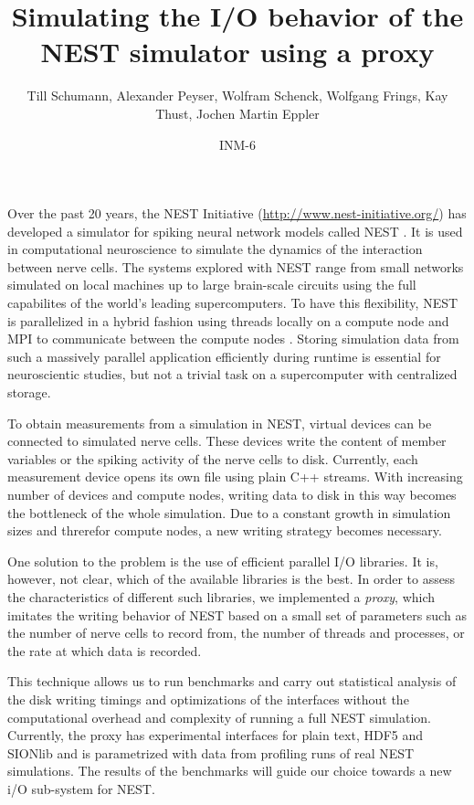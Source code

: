 \documentclass{article}
\title{Simulating the I/O behavior of the NEST simulator using a proxy}
\author{Till Schumann, Alexander Peyser, Wolfram Schenck, Wolfgang Frings, Kay Thust, Jochen Martin Eppler}
\date{INM-6}
\begin{document}
\maketitle

Over the past 20 years, the NEST Initiative
(\url{http://www.nest-initiative.org/}) has developed a simulator for
spiking neural network models called NEST \cite{NEST}. It is used in
computational neuroscience to simulate the dynamics of the interaction
between nerve cells. The systems explored with NEST range from small
networks simulated on local machines up to large brain-scale circuits
using the full capabilites of the world's leading supercomputers. To
have this flexibility, NEST is parallelized in a hybrid fashion using
threads locally on a compute node and MPI to communicate between the
compute nodes \cite{Plesser07}.  Storing simulation data from such a
massively parallel application efficiently during runtime is essential
for neuroscientic studies, but not a trivial task on a supercomputer
with centralized storage.

To obtain measurements from a simulation in NEST, virtual devices can
be connected to simulated nerve cells. These devices write the content
of member variables or the spiking activity of the nerve cells to
disk. Currently, each measurement device opens its own file using
plain C++ streams.  With increasing number of devices and compute
nodes, writing data to disk in this way becomes the bottleneck of the
whole simulation. Due to a constant growth in simulation sizes and
threrefor compute nodes, a new writing strategy becomes necessary.

One solution to the problem is the use of efficient parallel I/O
libraries. It is, however, not clear, which of the available libraries
is the best. In order to assess the characteristics of different such
libraries, we implemented a \emph{proxy}, which imitates the writing
behavior of NEST based on a small set of parameters such as the number
of nerve cells to record from, the number of threads and processes, or
the rate at which data is recorded.

This technique allows us to run benchmarks and carry out statistical
analysis of the disk writing timings and optimizations of the
interfaces without the computational overhead and complexity of
running a full NEST simulation. Currently, the proxy has experimental
interfaces for plain text, HDF5 \cite{hdf2010hierarchical} and SIONlib
\cite{frings2009scalable} and is parametrized with data from profiling
runs of real NEST simulations. The results of the benchmarks will
guide our choice towards a new i/O sub-system for NEST.




\end{document}

